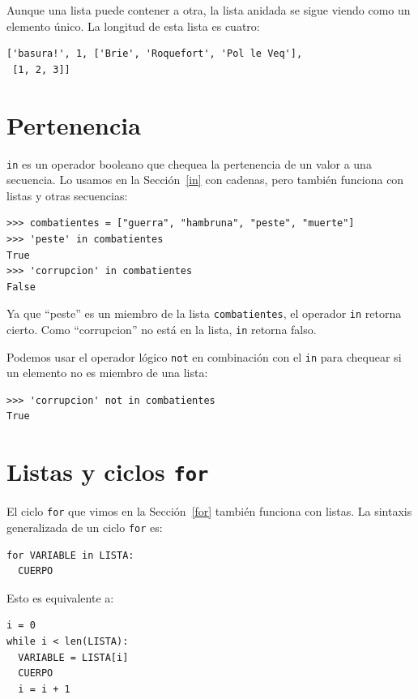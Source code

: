 Aunque una lista puede contener a otra, la lista anidada se sigue
viendo como un elemento único. La longitud de esta lista es cuatro:
\begin{verbatim}
['basura!', 1, ['Brie', 'Roquefort', 'Pol le Veq'], 
 [1, 2, 3]]
\end{verbatim}

\section{Pertenencia}

  

\texttt{in} es un operador booleano que chequea la pertenencia de
un valor a una secuencia. Lo usamos en la Sección~\ref{in} con cadenas,
pero también funciona con listas y otras secuencias:
\begin{verbatim}
>>> combatientes = ["guerra", "hambruna", "peste", "muerte"]
>>> 'peste' in combatientes
True
>>> 'corrupcion' in combatientes
False
\end{verbatim}

Ya que ``peste'' es un miembro de la lista \texttt{combatientes},
el operador \texttt{in} retorna cierto. Como ``corrupcion'' no está
en la lista, \texttt{in} retorna falso.

Podemos usar el operador lógico \texttt{not} en combinación con el
\texttt{in} para chequear si un elemento no es miembro de una lista:
\begin{verbatim}
>>> 'corrupcion' not in combatientes
True
\end{verbatim}

\section{Listas y ciclos \texttt{for}}

  

El ciclo \texttt{for} que vimos en la Sección~\ref{for} también
funciona con listas. La sintaxis generalizada de un ciclo \texttt{for}
es:
\begin{verbatim}
for VARIABLE in LISTA:
  CUERPO
\end{verbatim}

Esto es equivalente a:
\begin{verbatim}
i = 0
while i < len(LISTA):
  VARIABLE = LISTA[i]
  CUERPO
  i = i + 1
\end{verbatim}

